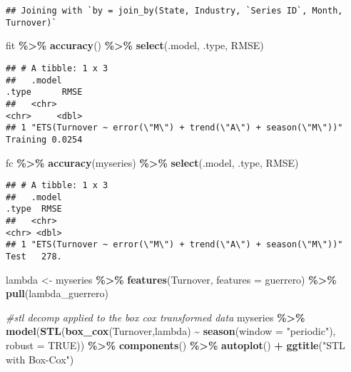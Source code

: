 \documentclass[
]{article}
\newenvironment{Shaded}{\begin{snugshade}}{\end{snugshade}}
\newcommand{\AttributeTok}[1]{\textcolor[rgb]{0.13,0.29,0.53}{#1}}
\newcommand{\CommentTok}[1]{\textcolor[rgb]{0.56,0.35,0.01}{\textit{#1}}}
\newcommand{\ConstantTok}[1]{\textcolor[rgb]{0.56,0.35,0.01}{#1}}
\newcommand{\FunctionTok}[1]{\textcolor[rgb]{0.13,0.29,0.53}{\textbf{#1}}}
\newcommand{\NormalTok}[1]{#1}
\newcommand{\OtherTok}[1]{\textcolor[rgb]{0.56,0.35,0.01}{#1}}
\newcommand{\SpecialCharTok}[1]{\textcolor[rgb]{0.81,0.36,0.00}{\textbf{#1}}}
\newcommand{\StringTok}[1]{\textcolor[rgb]{0.31,0.60,0.02}{#1}}
\begin{document}
\begin{verbatim}
## Joining with `by = join_by(State, Industry, `Series ID`, Month, Turnover)`
\end{verbatim}

\begin{Shaded}
\begin{Highlighting}[]
\NormalTok{fit }\SpecialCharTok{\%\textgreater{}\%} \FunctionTok{accuracy}\NormalTok{() }\SpecialCharTok{\%\textgreater{}\%}
  \FunctionTok{select}\NormalTok{(.model, .type, RMSE)}
\end{Highlighting}
\end{Shaded}

\begin{verbatim}
## # A tibble: 1 x 3
##   .model                                                        .type      RMSE
##   <chr>                                                         <chr>     <dbl>
## 1 "ETS(Turnover ~ error(\"M\") + trend(\"A\") + season(\"M\"))" Training 0.0254
\end{verbatim}

\begin{Shaded}
\begin{Highlighting}[]
\NormalTok{fc }\SpecialCharTok{\%\textgreater{}\%} \FunctionTok{accuracy}\NormalTok{(myseries) }\SpecialCharTok{\%\textgreater{}\%}
  \FunctionTok{select}\NormalTok{(.model, .type, RMSE)}
\end{Highlighting}
\end{Shaded}

\begin{verbatim}
## # A tibble: 1 x 3
##   .model                                                        .type  RMSE
##   <chr>                                                         <chr> <dbl>
## 1 "ETS(Turnover ~ error(\"M\") + trend(\"A\") + season(\"M\"))" Test   278.
\end{verbatim}

\begin{Shaded}
\begin{Highlighting}[]
\NormalTok{lambda }\OtherTok{\textless{}{-}}\NormalTok{ myseries }\SpecialCharTok{\%\textgreater{}\%}
  \FunctionTok{features}\NormalTok{(Turnover, }\AttributeTok{features =}\NormalTok{ guerrero) }\SpecialCharTok{\%\textgreater{}\%}
  \FunctionTok{pull}\NormalTok{(lambda\_guerrero)}

\CommentTok{\#stl decomp applied to the box cox transformed data}
\NormalTok{myseries }\SpecialCharTok{\%\textgreater{}\%}
  \FunctionTok{model}\NormalTok{(}\FunctionTok{STL}\NormalTok{(}\FunctionTok{box\_cox}\NormalTok{(Turnover,lambda) }\SpecialCharTok{\textasciitilde{}} \FunctionTok{season}\NormalTok{(}\AttributeTok{window =} \StringTok{"periodic"}\NormalTok{), }\AttributeTok{robust =} \ConstantTok{TRUE}\NormalTok{)) }\SpecialCharTok{\%\textgreater{}\%}
  \FunctionTok{components}\NormalTok{() }\SpecialCharTok{\%\textgreater{}\%}
  \FunctionTok{autoplot}\NormalTok{() }\SpecialCharTok{+}
  \FunctionTok{ggtitle}\NormalTok{(}\StringTok{"STL with Box{-}Cox"}\NormalTok{)}
\end{Highlighting}
\end{Shaded}
\end{document}

